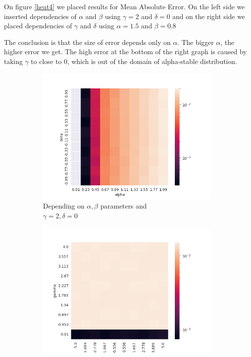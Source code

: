 \documentclass{article}
\begin{document}
        On figure \ref{heat4} we placed results for Mean Absolute Error. On the left side we inserted dependencies of $\alpha$ and $\beta$ using $\gamma=2$ and $\delta=0$ and on the right side we placed dependencies of $\gamma$ and $\delta$ using $\alpha=1.5$ and $\beta=0.8$

        The conclusion is that the size of error depends only on $\alpha$. The bigger $\alpha$, the higher error we get. The high error at the bottom of the right graph is caused by taking $\gamma$ to close to 0, which is out of the domain of alpha-stable distribution.

		\begin{figure}[H]
			\begin{subfigure}{.5\textwidth}
				\centering
				\includegraphics[width=1\linewidth]{images/heatmap_cf_MAE_alpha_beta.png}
				\caption{Depending on $\alpha, \beta$ parameters and \\$\gamma = 2, \delta = 0$}
			\end{subfigure}
			\begin{subfigure}[r]{.5\textwidth}
				\centering
				\includegraphics[width=1\linewidth]{images/heatmap_cf_MAE_gamma_delta.png}

\end{subfigure}
\end{figure}
\end{document}
